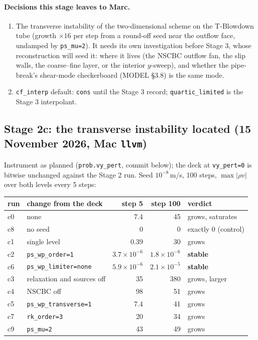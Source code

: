 \documentclass[11pt,a4paper]{article}
\newcommand{\code}[1]{\texttt{\small #1}}
\begin{document}
\paragraph{Decisions this stage leaves to Marc.}
\label{sec:stage2bdecide}
\begin{enumerate}[nosep]
\item The transverse instability of the two-dimensional scheme on the
      T-Blowdown tube (growth $\times16$ per step from a round-off seed
      near the outflow face, undamped by \code{ps\_mu=2}).  It needs its
      own investigation before Stage 3, whose reconstruction will seed
      it: where it lives (the NSCBC outflow fan, the slip walls, the
      coarse--fine layer, or the interior $y$-sweep), and whether the
      pipe-break's shear-mode checkerboard (MODEL \S3.8) is the same
      mode.
\item \code{cf\_interp} default: \code{cons} until the Stage 3 record;
      \code{quartic\_limited} is the Stage 3 interpolant.
\end{enumerate}


\subsection{Stage 2c: the transverse instability located (15 November 2026, Mac \code{llvm})}
\label{sec:stage2c}

Instrument as planned (\code{prob.vy\_pert}, commit below); the deck at
\code{vy\_pert=0} is bitwise unchanged against the Stage 2 run.  Seed
$10^{-8}$\,m/s, 100 steps, $\max|\rho v|$ over both levels every 5 steps:

\begin{center}
\small
\begin{tabular}{llrrl}
\toprule
run & change from the deck & step 5 & step 100 & verdict \\
\midrule
c0 & none & 7.4 & 45 & grows, saturates \\
c8 & no seed & 0 & 0 & exactly 0 (control) \\
c1 & single level & 0.39 & 30 & grows \\
c2 & \code{ps\_wp\_order=1} & $3.7\times10^{-6}$ & $1.8\times10^{-6}$ & \textbf{stable} \\
c6 & \code{ps\_wp\_limiter=none} & $5.9\times10^{-6}$ & $2.1\times10^{-5}$ & \textbf{stable} \\
c3 & relaxation and sources off & 35 & 380 & grows, larger \\
c4 & NSCBC off & 98 & 51 & grows \\
c5 & \code{ps\_wp\_transverse=1} & 7.4 & 41 & grows \\
c7 & \code{rk\_order=3} & 20 & 34 & grows \\
c9 & \code{ps\_mu=2} & 43 & 49 & grows \\
\bottomrule
\end{tabular}
\end{center}
\end{document}
